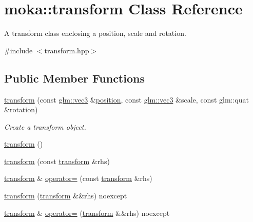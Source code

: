 \hypertarget{classmoka_1_1transform}{}\section{moka\+::transform Class Reference}
\label{classmoka_1_1transform}


A transform class enclosing a position, scale and rotation.  




{\ttfamily \#include $<$transform.\+hpp$>$}

\subsection*{Public Member Functions}
\begin{DoxyCompactItemize}
\item 
\mbox{\hyperlink{classmoka_1_1transform_aa6b24d02e183f22c5ae6a558f3b30c97}{transform}} (const \mbox{\hyperlink{namespacemoka_aed2224bc0e5b79e57a8975ded94ee1aaa97ade28e93c0de60adc075bdbe07ca36}{glm\+::vec3}} \&\mbox{\hyperlink{namespacemoka_a16a7bd7fc66f698dfcaf9bca1312a2bba4757fe07fd492a8be0ea6a760d683d6e}{position}}, const \mbox{\hyperlink{namespacemoka_aed2224bc0e5b79e57a8975ded94ee1aaa97ade28e93c0de60adc075bdbe07ca36}{glm\+::vec3}} \&scale, const glm\+::quat \&rotation)
\begin{DoxyCompactList}\small\item\em Create a transform object. \end{DoxyCompactList}\item 
\mbox{\hyperlink{classmoka_1_1transform_ab0f822acb5c704fb99f6066ba38ccbdd}{transform}} ()
\item 
\mbox{\hyperlink{classmoka_1_1transform_adfecd90714b971efe3ba8bea1ad41b83}{transform}} (const \mbox{\hyperlink{classmoka_1_1transform}{transform}} \&rhs)
\item 
\mbox{\hyperlink{classmoka_1_1transform}{transform}} \& \mbox{\hyperlink{classmoka_1_1transform_ad7ea9908ebf679c89a5c329208791fcf}{operator=}} (const \mbox{\hyperlink{classmoka_1_1transform}{transform}} \&rhs)
\item 
\mbox{\hyperlink{classmoka_1_1transform_a321493f9e8b4013b7db93b719d471568}{transform}} (\mbox{\hyperlink{classmoka_1_1transform}{transform}} \&\&rhs) noexcept
\item 
\mbox{\hyperlink{classmoka_1_1transform}{transform}} \& \mbox{\hyperlink{classmoka_1_1transform_a78e08f231ced4f99808ba2a66eace1a0}{operator=}} (\mbox{\hyperlink{classmoka_1_1transform}{transform}} \&\&rhs) noexcept

\end{DoxyCompactItemize}

